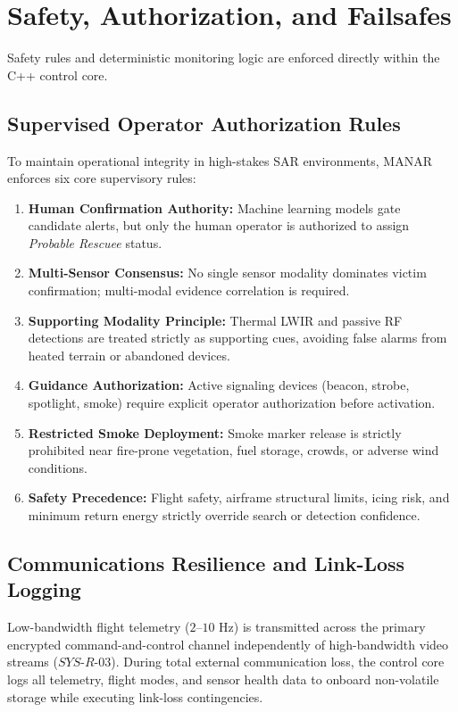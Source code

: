 \section{Safety, Authorization, and Failsafes}

Safety rules and deterministic monitoring logic are enforced directly within the C++ control core.

\subsection{Supervised Operator Authorization Rules}
To maintain operational integrity in high-stakes SAR environments, MANAR enforces six core supervisory rules:
\begin{enumerate}
    \item \textbf{Human Confirmation Authority:} Machine learning models gate candidate alerts, but only the human operator is authorized to assign \emph{Probable Rescuee} status.
    \item \textbf{Multi-Sensor Consensus:} No single sensor modality dominates victim confirmation; multi-modal evidence correlation is required.
    \item \textbf{Supporting Modality Principle:} Thermal LWIR and passive RF detections are treated strictly as supporting cues, avoiding false alarms from heated terrain or abandoned devices.
    \item \textbf{Guidance Authorization:} Active signaling devices (beacon, strobe, spotlight, smoke) require explicit operator authorization before activation.
    \item \textbf{Restricted Smoke Deployment:} Smoke marker release is strictly prohibited near fire-prone vegetation, fuel storage, crowds, or adverse wind conditions.
    \item \textbf{Safety Precedence:} Flight safety, airframe structural limits, icing risk, and minimum return energy strictly override search or detection confidence.
\end{enumerate}

\subsection{Communications Resilience and Link-Loss Logging}
Low-bandwidth flight telemetry ($2\text{--}10\text{ Hz}$) is transmitted across the primary encrypted command-and-control channel independently of high-bandwidth video streams ($SYS\text{-}R\text{-}03$). During total external communication loss, the control core logs all telemetry, flight modes, and sensor health data to onboard non-volatile storage while executing link-loss contingencies.

